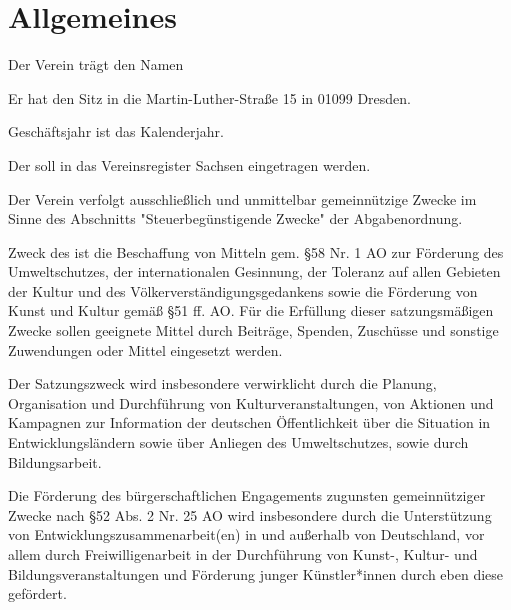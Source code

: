 



\subject{Vereinssatzung}
\title{\name}
\subtitle{Vereinssatzung für den \name}
\date{\today \\ \version}
\maketitle

\tableofcontents

\appendix

\section{Allgemeines}
\begin{contract}


    Der Verein trägt den Namen \name

    Er hat den Sitz in die Martin-Luther-Straße 15 in 01099 Dresden.

    Geschäftsjahr ist das Kalenderjahr.

    Der \name soll in das Vereinsregister Sachsen eingetragen werden.


    \label{clause:vereinszweck}

    Der Verein verfolgt ausschließlich und unmittelbar gemeinnützige Zwecke im Sinne des Abschnitts "Steuerbegünstigende Zwecke" der Abgabenordnung.
    \label{zweckbindung}

    Zweck des \name ist die Beschaffung von Mitteln gem. \S 58 Nr. 1 AO zur Förderung des Umweltschutzes, der internationalen Gesinnung, der Toleranz auf allen Gebieten der Kultur und des Völkerverständigungsgedankens sowie die Förderung von Kunst und Kultur gemäß \S 51 ff. AO. Für die Erfüllung dieser satzungsmäßigen Zwecke sollen geeignete Mittel durch Beiträge, Spenden, Zuschüsse und sonstige Zuwendungen oder Mittel eingesetzt werden.

    Der Satzungszweck wird insbesondere verwirklicht durch die Planung, Organisation und Durchführung von Kulturveranstaltungen, von Aktionen und Kampagnen zur Information der deutschen Öffentlichkeit über die Situation in Entwicklungsländern sowie über Anliegen des Umweltschutzes, sowie durch Bildungsarbeit.

    Die Förderung des bürgerschaftlichen Engagements zugunsten gemeinnütziger Zwecke nach \S 52 Abs. 2 Nr. 25 AO wird insbesondere durch die Unterstützung von Entwicklungszusammenarbeit(en) in und außerhalb von Deutschland, vor allem durch Freiwilligenarbeit in der Durchführung von Kunst-, Kultur- und Bildungsveranstaltungen und Förderung junger Künstler*innen durch eben diese gefördert.


\end{contract}
